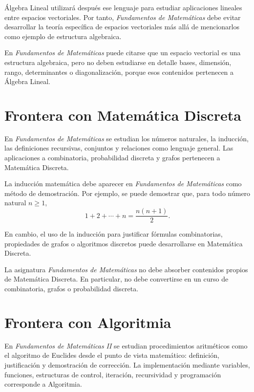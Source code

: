 Álgebra Lineal utilizará después ese lenguaje para estudiar aplicaciones lineales entre espacios vectoriales. Por tanto, \emph{Fundamentos de Matemáticas} debe evitar desarrollar la teoría específica de espacios vectoriales más allá de mencionarlos como ejemplo de estructura algebraica.

\begin{advertencia}
En \emph{Fundamentos de Matemáticas} puede citarse que un espacio vectorial es una estructura algebraica, pero no deben estudiarse en detalle bases, dimensión, rango, determinantes o diagonalización, porque esos contenidos pertenecen a Álgebra Lineal.
\end{advertencia}

\section{Frontera con Matemática Discreta}

\begin{convencion}
En \emph{Fundamentos de Matemáticas} se estudian los números naturales, la inducción, las definiciones recursivas, conjuntos y relaciones como lenguaje general. Las aplicaciones a combinatoria, probabilidad discreta y grafos pertenecen a Matemática Discreta.
\end{convencion}

La inducción matemática debe aparecer en \emph{Fundamentos de Matemáticas} como método de demostración. Por ejemplo, se puede demostrar que, para todo número natural \(n\geq 1\),
\[
  1+2+\cdots+n=\frac{n(n+1)}{2}.
\]

En cambio, el uso de la inducción para justificar fórmulas combinatorias, propiedades de grafos o algoritmos discretos puede desarrollarse en Matemática Discreta.

\begin{advertencia}
La asignatura \emph{Fundamentos de Matemáticas} no debe absorber contenidos propios de Matemática Discreta. En particular, no debe convertirse en un curso de combinatoria, grafos o probabilidad discreta.
\end{advertencia}

\section{Frontera con Algoritmia}

\begin{convencion}
En \emph{Fundamentos de Matemáticas II} se estudian procedimientos aritméticos como el algoritmo de Euclides desde el punto de vista matemático: definición, justificación y demostración de corrección. La implementación mediante variables, funciones, estructuras de control, iteración, recursividad y programación corresponde a Algoritmia.
\end{convencion}

